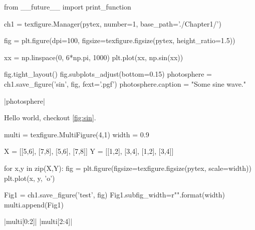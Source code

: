  
































\begin{pycode}[chapter1]
from __future__ import print_function

ch1 = texfigure.Manager(pytex, number=1, base_path='./Chapter1/')
\end{pycode}

\begin{pycode}[chapter1]
fig = plt.figure(dpi=100, figsize=texfigure.figsize(pytex, height_ratio=1.5))

xx = np.linspace(0, 6*np.pi, 1000)
plt.plot(xx, np.sin(xx))

fig.tight_layout()
fig.subplots_adjust(bottom=0.15)
photosphere = ch1.save_figure('sin', fig, fext='.pgf')
photosphere.caption = "Some sine wave."
\end{pycode}

\py[chapter1]|photosphere|



Hello world, checkout \cref{fig:sin}.


\begin{pycode}[chapter1]
	
multi = texfigure.MultiFigure(4,1)
width = 0.9

X = [[5,6], [7,8], [5,6], [7,8]]
Y = [[1,2], [3,4], [1,2], [3,4]]

for x,y in zip(X,Y):
	fig = plt.figure(figsize=texfigure.figsize(pytex, scale=width))
	plt.plot(x, y, 'o')
	
	Fig1 = ch1.save_figure('test', fig)
	Fig1.subfig_width=r"{}\columnwidth".format(width)
	multi.append(Fig1)
\end{pycode}

\py[chapter1]|multi[0:2]|
\py[chapter1]|multi[2:4]|
